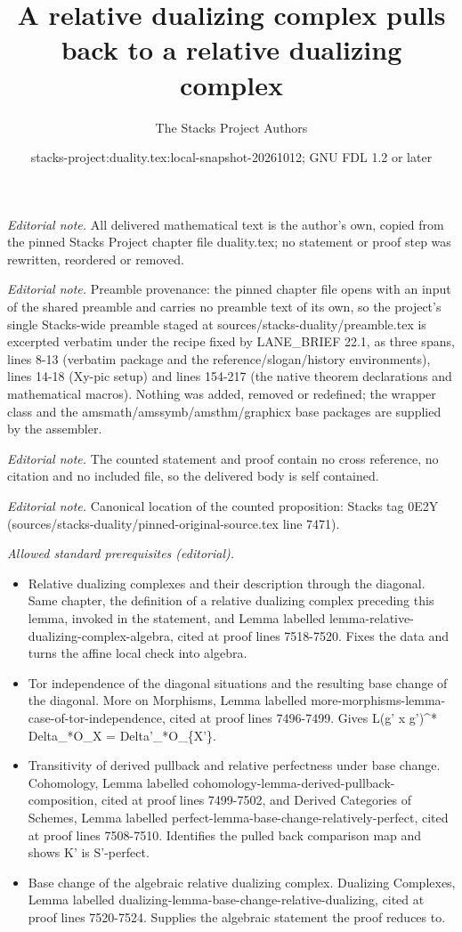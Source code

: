 \documentclass[10pt,a4paper]{amsart}
\title{A relative dualizing complex pulls back to a relative dualizing complex}
\author{The Stacks Project Authors}
\date{stacks-project:duality.tex:local-snapshot-20261012; GNU FDL 1.2 or later}
\theoremstyle{plain}
\theoremstyle{definition}
\theoremstyle{remark}
\numberwithin{equation}{subsection}
\begin{document}
\maketitle
\noindent\textit{Editorial note.} All delivered mathematical text is the author's own, copied from the pinned Stacks Project chapter file duality.tex; no statement or proof step was rewritten, reordered or removed.\par\medskip
\noindent\textit{Editorial note.} Preamble provenance: the pinned chapter file opens with an input of the shared preamble and carries no preamble text of its own, so the project's single Stacks-wide preamble staged at sources/stacks-duality/preamble.tex is excerpted verbatim under the recipe fixed by LANE\_BRIEF 22.1, as three spans, lines 8-13 (verbatim package and the reference/slogan/history environments), lines 14-18 (Xy-pic setup) and lines 154-217 (the native theorem declarations and mathematical macros). Nothing was added, removed or redefined; the wrapper class and the amsmath/amssymb/amsthm/graphicx base packages are supplied by the assembler.\par\medskip
\noindent\textit{Editorial note.} The counted statement and proof contain no cross reference, no citation and no included file, so the delivered body is self contained.\par\medskip
\noindent\textit{Editorial note.} Canonical location of the counted proposition: Stacks tag 0E2Y (sources/stacks-duality/pinned-original-source.tex line 7471).\par\medskip
\noindent\textit{Allowed standard prerequisites (editorial).}\begin{itemize}
\item Relative dualizing complexes and their description through the diagonal. Same chapter, the definition of a relative dualizing complex preceding this lemma, invoked in the statement, and Lemma labelled lemma-relative-dualizing-complex-algebra, cited at proof lines 7518-7520. Fixes the data and turns the affine local check into algebra.
\item Tor independence of the diagonal situations and the resulting base change of the diagonal. More on Morphisms, Lemma labelled more-morphisms-lemma-case-of-tor-independence, cited at proof lines 7496-7499. Gives L(g' x g')\textasciicircum{}* Delta\_*O\_X = Delta'\_*O\_\{X'\}.
\item Transitivity of derived pullback and relative perfectness under base change. Cohomology, Lemma labelled cohomology-lemma-derived-pullback-composition, cited at proof lines 7499-7502, and Derived Categories of Schemes, Lemma labelled perfect-lemma-base-change-relatively-perfect, cited at proof lines 7508-7510. Identifies the pulled back comparison map and shows K' is S'-perfect.
\item Base change of the algebraic relative dualizing complex. Dualizing Complexes, Lemma labelled dualizing-lemma-base-change-relative-dualizing, cited at proof lines 7520-7524. Supplies the algebraic statement the proof reduces to.
\end{itemize}\medskip
\end{document}
